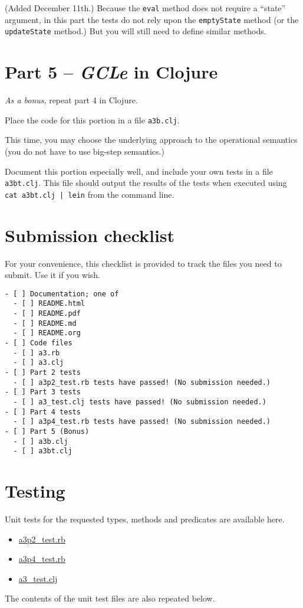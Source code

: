 \documentclass[11pt]{article}
\theoremstyle{definition}
\begin{document}
(Added December 11th.)
Because the \texttt{eval} method does not require a “state” argument,
in this part the tests do not rely upon the \texttt{emptyState} method
(or the \texttt{updateState} method.) But you will still need
to define similar methods.

\section*{Part 5 – \emph{GCLe} in Clojure}
\label{sec:org8a230dc}
\emph{As a bonus}, repeat part 4 in Clojure.

Place the code for this portion in a file \texttt{a3b.clj}.

This time, you may choose the underlying approach to the operational semantics
(you do not have to use big-step semantics.)

Document this portion especially well, and include your own
tests in a file \texttt{a3bt.clj}. This file should output the results of the tests
when executed using \texttt{cat a3bt.clj | lein} from the command line.

\section*{Submission checklist}
\label{sec:orga2e2bd6}
For your convenience, this checklist is provided
to track the files you need to submit.
Use it if you wish.
\begin{verbatim}
- [ ] Documentation; one of
  - [ ] README.html
  - [ ] README.pdf
  - [ ] README.md
  - [ ] README.org
- [ ] Code files
  - [ ] a3.rb
  - [ ] a3.clj
- [ ] Part 2 tests
  - [ ] a3p2_test.rb tests have passed! (No submission needed.)
- [ ] Part 3 tests
  - [ ] a3_test.clj tests have passed! (No submission needed.)
- [ ] Part 4 tests
  - [ ] a3p4_test.rb tests have passed! (No submission needed.)
- [ ] Part 5 (Bonus)
  - [ ] a3b.clj
  - [ ] a3bt.clj
\end{verbatim}

\section*{Testing}
\label{sec:org3c3511e}
Unit tests for the requested types, methods and predicates
are available here.
\begin{itemize}
\item \href{./testing/a3/a3p2\_test.rb}{a3p2\_test.rb}
\item \href{./testing/a3/a3p4\_test.rb}{a3p4\_test.rb}
\item \href{./testing/a3/a3\_test.clj}{a3\_test.clj}
\end{itemize}
The contents of the unit test files are also repeated below.
\end{document}
